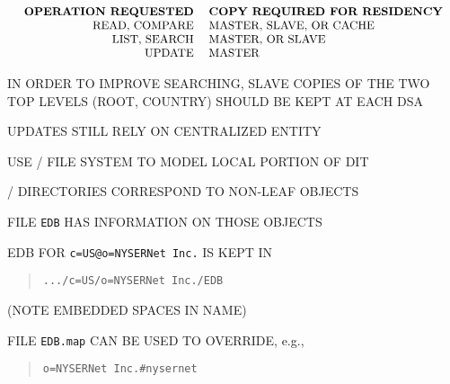 \begin{bwslide}

\[\small\begin{tabular}{rl}
\bf OPERATION REQUESTED&
		\bf COPY REQUIRED FOR RESIDENCY\\
READ, COMPARE&	MASTER, SLAVE, OR CACHE\\
LIST, SEARCH&	MASTER, OR SLAVE\\
UPDATE&		MASTER\\
\end{tabular}\]

\begin{nrtc}
\item	IN ORDER TO IMPROVE SEARCHING,
	SLAVE COPIES OF THE TWO TOP LEVELS (ROOT, COUNTRY) SHOULD BE KEPT AT
	EACH DSA

\item	UPDATES STILL RELY ON CENTRALIZED ENTITY
\end{nrtc}
\end{bwslide}


\begin{bwslide}

\begin{nrtc}
\item	USE \unix/ FILE SYSTEM TO MODEL LOCAL PORTION OF DIT
    \begin{nrtc}
    \item	\unix/ DIRECTORIES CORRESPOND TO NON-LEAF OBJECTS

    \item	FILE \verb"EDB" HAS INFORMATION ON THOSE OBJECTS
    \end{nrtc}

\item	EDB FOR \verb"c=US@o=NYSERNet Inc." IS KEPT IN
\begin{quote}\small\begin{verbatim}
.../c=US/o=NYSERNet Inc./EDB
\end{verbatim}\end{quote}
(NOTE EMBEDDED SPACES IN NAME)

\item	FILE \verb"EDB.map" CAN BE USED TO OVERRIDE, e.g.,
\begin{quote}\small\begin{verbatim}
o=NYSERNet Inc.#nysernet
\end{verbatim}\end{quote}
\end{nrtc}
\end{bwslide}


